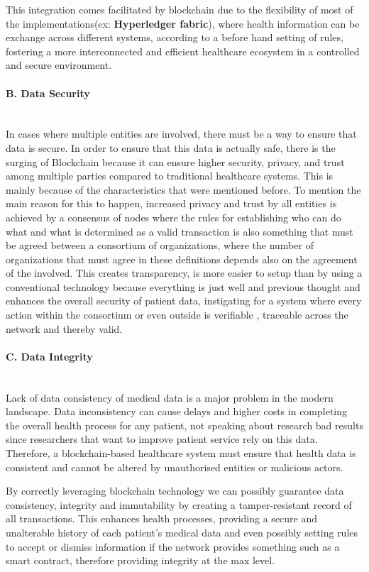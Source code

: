 This integration comes facilitated by blockchain due to the flexibility of most of the implementations(ex: \textbf{Hyperledger fabric}), where health information can be exchange across different systems, according to a before hand setting of rules, fostering a more interconnected and efficient healthcare ecosystem in a controlled and secure environment.
\paragraph{B. Data Security} \mbox{}\\
In cases where multiple entities are involved, there must be a way to ensure that data is secure. In order to ensure that this data is actually safe, there is the surging of Blockchain because it can ensure higher security, privacy, and trust among multiple parties compared to traditional healthcare systems. This is mainly because of the characteristics that were mentioned before. To mention the main reason for this to happen, increased privacy and trust by all entities is achieved by a consensus of nodes where the rules for establishing who can do what and what is determined as a valid transaction is also something that must be agreed between a consortium of organizations, where the number of organizations that must agree in these definitions depends also on the agreement of the involved. This creates transparency, is more easier to setup than by using a conventional technology because everything is just well and previous thought and enhances the overall security of patient data, instigating for a system where every action within the consortium or even outside is verifiable , traceable across the network and thereby valid.
\paragraph{C. Data Integrity} \mbox{}\\
Lack of data consistency of medical data is a major problem in the modern landscape. Data inconsistency can cause delays and higher costs in completing the overall health process for any patient, not speaking about research bad results since researchers that want to improve patient service rely on this data. Therefore, a blockchain-based healthcare system must ensure that health data is consistent and cannot be altered by unauthorised entities or malicious actors.

By correctly leveraging blockchain technology we can possibly guarantee data consistency, integrity and immutability by creating a tamper-resistant record of all transactions. This enhances health processes, providing a secure and unalterable history of each patient's medical data and even possibly setting rules to accept or dismiss information if the network provides something such as a smart contract, therefore providing integrity at the max level.
